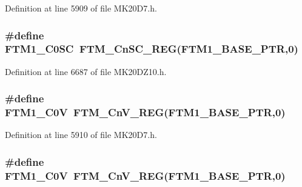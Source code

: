 Definition at line 5909 of file M\+K20\+D7.\+h.

\subsubsection[{\texorpdfstring{F\+T\+M1\+\_\+\+C0\+SC}{FTM1_C0SC}}]{\setlength{\rightskip}{0pt plus 5cm}\#define F\+T\+M1\+\_\+\+C0\+SC~{\bf F\+T\+M\+\_\+\+Cn\+S\+C\+\_\+\+R\+EG}({\bf F\+T\+M1\+\_\+\+B\+A\+S\+E\+\_\+\+P\+TR},0)}\hypertarget{group___f_t_m___register___accessor___macros_gaac1710c65463d98f9003b4a10991b26b}{}\label{group___f_t_m___register___accessor___macros_gaac1710c65463d98f9003b4a10991b26b}


Definition at line 6687 of file M\+K20\+D\+Z10.\+h.

\subsubsection[{\texorpdfstring{F\+T\+M1\+\_\+\+C0V}{FTM1_C0V}}]{\setlength{\rightskip}{0pt plus 5cm}\#define F\+T\+M1\+\_\+\+C0V~{\bf F\+T\+M\+\_\+\+Cn\+V\+\_\+\+R\+EG}({\bf F\+T\+M1\+\_\+\+B\+A\+S\+E\+\_\+\+P\+TR},0)}\hypertarget{group___f_t_m___register___accessor___macros_ga5ff1e1bfd9de0887b077af86dfa74469}{}\label{group___f_t_m___register___accessor___macros_ga5ff1e1bfd9de0887b077af86dfa74469}


Definition at line 5910 of file M\+K20\+D7.\+h.

\subsubsection[{\texorpdfstring{F\+T\+M1\+\_\+\+C0V}{FTM1_C0V}}]{\setlength{\rightskip}{0pt plus 5cm}\#define F\+T\+M1\+\_\+\+C0V~{\bf F\+T\+M\+\_\+\+Cn\+V\+\_\+\+R\+EG}({\bf F\+T\+M1\+\_\+\+B\+A\+S\+E\+\_\+\+P\+TR},0)}\hypertarget{group___f_t_m___register___accessor___macros_ga5ff1e1bfd9de0887b077af86dfa74469}{}\label{group___f_t_m___register___accessor___macros_ga5ff1e1bfd9de0887b077af86dfa74469}


